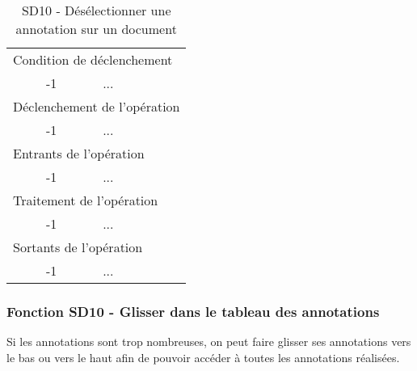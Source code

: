 \documentclass[a4paper]{article}
\begin{document}
\begin{table}[H]
  \centering
   \small
	\begin{tabular}{|c|p{12cm}|}
   		\hline
   			\rowcolor{lightgray}\multicolumn{2}{|c|}{\textbf{SD09 - Désélectionner une annotation sur un document}} \\
   		\hline
   			\multicolumn{2}{|l|}{Condition de d\'eclenchement} \\
   		\hline
   			-1 & ...\\
   		\hline
   			\multicolumn{2}{|l|}{D\'eclenchement de l'op\'eration} \\
   		\hline
   			-1 & ...\\
   		\hline
   			\multicolumn{2}{|l|}{Entrants de l'op\'eration} \\
   		\hline
   			-1 & ...\\
   		\hline
   			\multicolumn{2}{|l|}{Traitement de l'op\'eration} \\
  		\hline
   			-1 & ...\\
   		\hline
   			\multicolumn{2}{|l|}{Sortants de l'op\'eration} \\
   		\hline
   			-1 & ...\\
   		\hline
	\end{tabular}
  \caption{SD10 - Désélectionner une annotation sur un document}
  \normalsize
  \label{tab:deselectionner_annotation}
\end{table}


\subsubsection{Fonction SD10 - Glisser dans le tableau des annotations}
Si les annotations sont trop nombreuses, on peut faire glisser ses annotations vers le bas ou vers le haut afin de pouvoir accéder à toutes les annotations réalisées.\\
\end{document}

